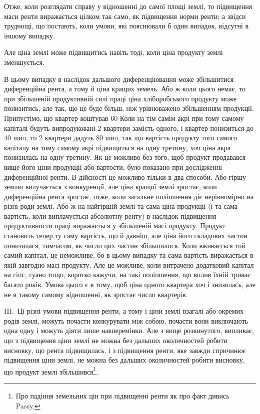 Отже, коли розглядати справу у відношенні до самої площі землі, то підвищення
маси ренти виражається цілком так само, як підвищення норми ренти;
а звідси труднощі, що постають, коли умови, які пояснювали б один випадок,
відсутні в іншому випадку.

Але ціна землі може підвищитись навіть тоді, коли ціна продукту землі
зменшується.

В цьому випадку в наслідок дальшого диференціювання може збільшитися
диференційна рента, а тому й ціна кращих земель. Або ж коли цього немає, то
при збільшеній продуктивній силі праці ціна хліборобського продукту може понизитись,
але так, що це буде більш, ніж урівноважено збільшенням продукції. Припустімо,
що квартер коштував 60 Коли на тім самім акрі при тому самому
капіталі будуть випродуковані 2 квартери замість одного, і квартер понизиться
до 40 шил, то 2 квартери дадуть 80 шил, так що вартість продукту того самого
капіталу на тому самому акрі підвищиться на одну третину, хоч ціна акра
понизилась на одну третину. Як це можливо без того, щоб продукт продавався
вище його ціни продукції або вартости, було показано при дослідженні диференційної
ренти. В дійсності це можливо тільки в два способи. Або гіршу
землю вилучається з конкуренції, але ціна кращої землі зростає, коли
диференційна рента зростає, отже, коли загальне поліпшення діє нерівномірно
на різні роди землі. Або ж на найгіршій землі та сама ціна продукції
(і та сама вартість, коли виплачується абсолютну ренту) в наслідок підвищення
продуктивности праці виражається у збільшеній масі продукту. Продукт
становить тепер ту саму вартість, що й давніш, але ціна його складових
частин понизилася, тимчасом, як число цих частин збільшилося. Коли вживається
той самий капітал, це неможливе, бо в цьому випадку та сама вартість
виражається в якій завгодно масі продукту. Але це можливе, коли витрачено
додатковий капітал на гіпс, гуано тощо, коротко кажучи, на такі поліпшення,
що вплив їхній триває багато років. Умова цього є в тому, щоб ціна одного квартера
хоч і знизилась, але не в такому самому відношенні, як зростає число квартерів.

III.~Ці різні умови підвищення ренти, а тому і ціни землі взагалі або окремих
родів землі, можуть почасти конкурувати між собою, почасти вони виключають
одна одну і можуть діяти лише навперемінки. Але з вище розвинутого, випливає,
що з підвищення ціни землі не можна без дальших околичностей робити
висновку, що рента підвищилась, і з підвищення ренти, яке завжди спричинює
підвищення ціни землі, не можна без дальших околичностей робити висновку,
що продукт землі збільшився\footnote{
Про падіння земельних цін при підвищенні ренти як про факт дивись Passy.
}.

